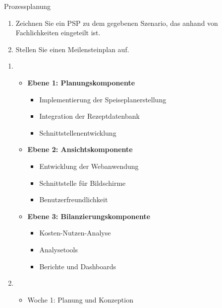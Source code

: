 \documentclass{article}
\begin{document}
\begin{exercise}{Prozessplanung}
  \begin{enumerate}
    \item Zeichnen Sie ein PSP zu dem gegebenen Szenario, das anhand von Fachlichkeiten eingeteilt ist.
    \item Stellen Sie einen Meilensteinplan auf.
  \end{enumerate}

  \begin{solution}
    \begin{enumerate}
      \item \begin{itemize}
              \item \textbf{Ebene 1: Planungskomponente}
                    \begin{itemize}
                      \item Implementierung der Speiseplanerstellung
                      \item Integration der Rezeptdatenbank
                      \item Schnittstellenentwicklung
                    \end{itemize}
              \item \textbf{Ebene 2: Ansichtskomponente}
                    \begin{itemize}
                      \item Entwicklung der Webanwendung
                      \item Schnittstelle für Bildschirme
                      \item Benutzerfreundlichkeit
                    \end{itemize}
              \item \textbf{Ebene 3: Bilanzierungskomponente}
                    \begin{itemize}
                      \item Kosten-Nutzen-Analyse
                      \item Analysetools
                      \item Berichte und Dashboards
                    \end{itemize}
            \end{itemize}
      \item \begin{itemize}
              \item Woche 1: Planung und Konzeption

\end{itemize}
\end{enumerate}
\end{solution}
\end{exercise}
\end{document}

